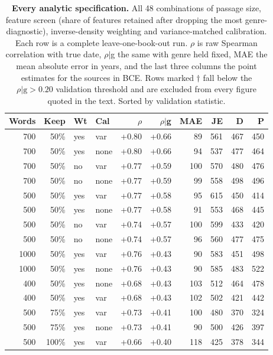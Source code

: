 \begin{table}[!ht]
\centering
\scriptsize
\caption{{\bf Every analytic specification.}  All 48 combinations of passage size, feature screen (share of features retained after dropping the most genre-diagnostic), inverse-density weighting and variance-matched calibration.  Each row is a complete leave-one-book-out run.  $\rho$ is raw Spearman correlation with true date, $\rho|$g the same with genre held fixed, MAE the mean absolute error in years, and the last three columns the point estimates for the sources in BCE.  Rows marked $\dagger$ fall below the $\rho|\mathrm{g} > 0.20$ validation threshold and are excluded from every figure quoted in the text.  Sorted by validation statistic.}
\label{tab:s9}
\begin{tabular}{rrllrrrrrr}
\toprule
\textbf{Words} & \textbf{Keep} & \textbf{Wt} & \textbf{Cal} & \textbf{$\rho$} & \textbf{$\rho|$g} & \textbf{MAE} & \textbf{JE} & \textbf{D} & \textbf{P} \\
\midrule
700 & 50\% & yes & var & +0.80 & +0.66 & 89 & 561 & 467 & 450 \\
700 & 50\% & yes & none & +0.80 & +0.66 & 94 & 537 & 477 & 464 \\
700 & 50\% & no & var & +0.77 & +0.59 & 100 & 570 & 480 & 476 \\
700 & 50\% & no & none & +0.77 & +0.59 & 99 & 558 & 498 & 496 \\
500 & 50\% & yes & var & +0.77 & +0.58 & 95 & 615 & 450 & 414 \\
500 & 50\% & yes & none & +0.77 & +0.58 & 91 & 553 & 468 & 445 \\
500 & 50\% & no & var & +0.74 & +0.57 & 100 & 599 & 433 & 420 \\
500 & 50\% & no & none & +0.74 & +0.57 & 96 & 560 & 477 & 475 \\
1000 & 50\% & yes & var & +0.76 & +0.43 & 90 & 583 & 451 & 498 \\
1000 & 50\% & yes & none & +0.76 & +0.43 & 90 & 585 & 483 & 522 \\
400 & 50\% & yes & none & +0.68 & +0.43 & 103 & 512 & 464 & 478 \\
400 & 50\% & yes & var & +0.68 & +0.43 & 102 & 502 & 421 & 442 \\
500 & 75\% & yes & var & +0.73 & +0.41 & 100 & 480 & 370 & 324 \\
500 & 75\% & yes & none & +0.73 & +0.41 & 90 & 500 & 426 & 397 \\
500 & 100\% & yes & var & +0.66 & +0.40 & 118 & 425 & 378 & 344 \\

\end{tabular}
\end{table}
